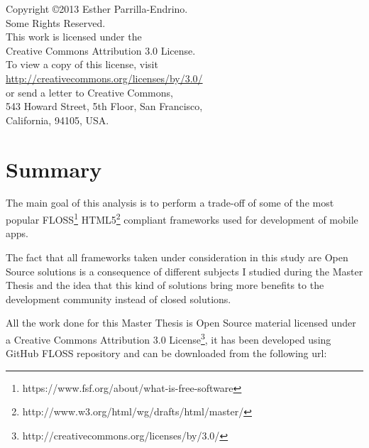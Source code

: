 \documentclass[a4paper,12pt]{book}
\begin{document}
\newpage
\thispagestyle{empty}
\vspace{5cm}
\begin{flushright}
\begin{large}
Copyright \copyright 2013 Esther Parrilla-Endrino.\\
Some Rights Reserved.\\
This work is licensed under the\\
Creative Commons Attribution 3.0 License.\\
To view a copy of this license, visit\\
\url{http://creativecommons.org/licenses/by/3.0/}\\
or send a letter to Creative Commons,\\
543 Howard Street, 5th Floor, San Francisco,\\
California, 94105, USA.\\
\end{large}
\end{flushright}

\newpage

\tableofcontents  %

\renewcommand{\refname}{Bibliography}
\addtolength{\parskip}{\baselineskip}


\chapter*{Summary}
\label{chap:summary}

The main goal of this analysis is to perform a trade-off of some of the most popular FLOSS\footnote{https://www.fsf.org/about/what-is-free-software} HTML5\footnote{http://www.w3.org/html/wg/drafts/html/master/} compliant frameworks used for development of mobile apps.

The fact that all frameworks taken under consideration in this study are Open Source solutions is a consequence of different subjects I studied during the Master Thesis and the idea that this kind of solutions bring more benefits to the development community instead of closed solutions.

All the work done for this Master Thesis is Open Source material licensed under a Creative Commons Attribution 3.0 License\footnote{http://creativecommons.org/licenses/by/3.0/}, it has been developed using GitHub FLOSS repository and can be downloaded from the following url:
\end{document}
